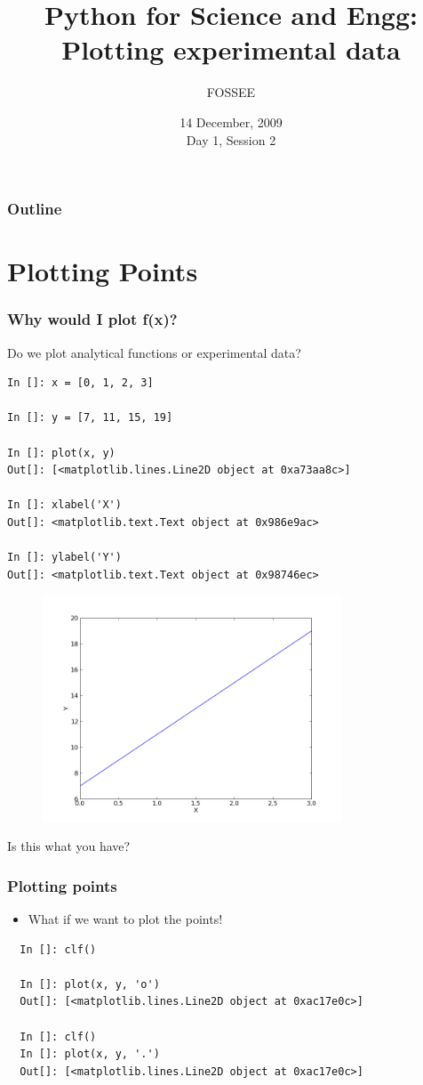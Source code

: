 \documentclass[14pt,compress]{beamer}
\title[Plotting with Python]{Python for Science and Engg: Plotting experimental data}
\author[FOSSEE] {FOSSEE}
\institute[IIT Bombay] {Department of Aerospace Engineering\\IIT Bombay}
\date[] {14 December, 2009\\Day 1, Session 2}
\begin{document}
\begin{frame}
  \titlepage
\end{frame}

\begin{frame}
  \frametitle{Outline}
  \tableofcontents
\end{frame}

\section{Plotting Points}
\begin{frame}[fragile]
\frametitle{Why would I plot f(x)?}
Do we plot analytical functions or experimental data?
\begin{small}
\begin{lstlisting}
In []: x = [0, 1, 2, 3]

In []: y = [7, 11, 15, 19]

In []: plot(x, y)
Out[]: [<matplotlib.lines.Line2D object at 0xa73aa8c>]

In []: xlabel('X')
Out[]: <matplotlib.text.Text object at 0x986e9ac>

In []: ylabel('Y')
Out[]: <matplotlib.text.Text object at 0x98746ec>
\end{lstlisting}
\end{small}
\end{frame}

\begin{frame}[fragile]
\begin{figure}
\includegraphics[width=3.5in]{data/straightline.png}
\end{figure}
\alert{Is this what you have?}
\end{frame}

\begin{frame}[fragile]
\frametitle{Plotting points}
\begin{itemize}
\item What if we want to plot the points!
\end{itemize}
\begin{lstlisting}
  In []: clf()

  In []: plot(x, y, 'o')
  Out[]: [<matplotlib.lines.Line2D object at 0xac17e0c>]

  In []: clf()
  In []: plot(x, y, '.')
  Out[]: [<matplotlib.lines.Line2D object at 0xac17e0c>]
\end{lstlisting}
\end{frame}
\end{document}
